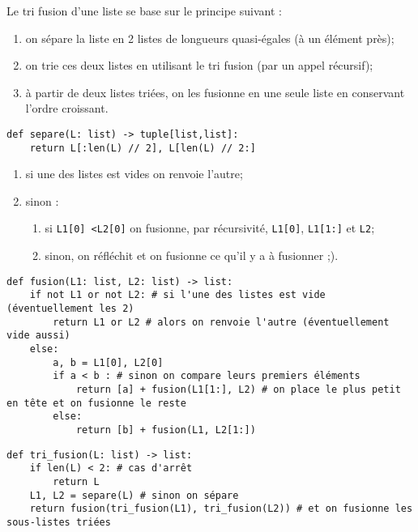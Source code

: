 
Le tri fusion d'une liste se base sur le principe suivant : 
\begin{enumerate}
\item on sépare la liste en 2 listes de longueurs quasi-égales (à un élément près);
\item on trie ces deux listes en utilisant le tri fusion (par un appel récursif);
\item à partir de deux listes triées, on les fusionne en une seule liste en conservant l'ordre croissant.
\end{enumerate}

\ifprof
\begin{lstlisting}
def separe(L: list) -> tuple[list,list]:
    return L[:len(L) // 2], L[len(L) // 2:]
\end{lstlisting}
\else
\fi


\itshape
\begin{enumerate}
\item si une des listes est vides on renvoie l'autre;
\item sinon : 
\begin{enumerate}
\item si \texttt{L1[0] <L2[0]} on fusionne, par récursivité, \texttt{L1[0]}, \texttt{L1[1:]} et \texttt{L2};
\item sinon, on réfléchit et on fusionne ce qu'il y a à fusionner ;).
\end{enumerate}
\end{enumerate}
\normalshape

\ifprof
\begin{lstlisting}
def fusion(L1: list, L2: list) -> list:
    if not L1 or not L2: # si l'une des listes est vide (éventuellement les 2)
        return L1 or L2 # alors on renvoie l'autre (éventuellement vide aussi)
    else:
        a, b = L1[0], L2[0] 
        if a < b : # sinon on compare leurs premiers éléments
            return [a] + fusion(L1[1:], L2) # on place le plus petit en tête et on fusionne le reste
        else:
            return [b] + fusion(L1, L2[1:])
\end{lstlisting}
\else
\fi




\ifprof
\begin{lstlisting}
def tri_fusion(L: list) -> list:
    if len(L) < 2: # cas d'arrêt
        return L
    L1, L2 = separe(L) # sinon on sépare
    return fusion(tri_fusion(L1), tri_fusion(L2)) # et on fusionne les sous-listes triées
\end{lstlisting}
\else
\fi
